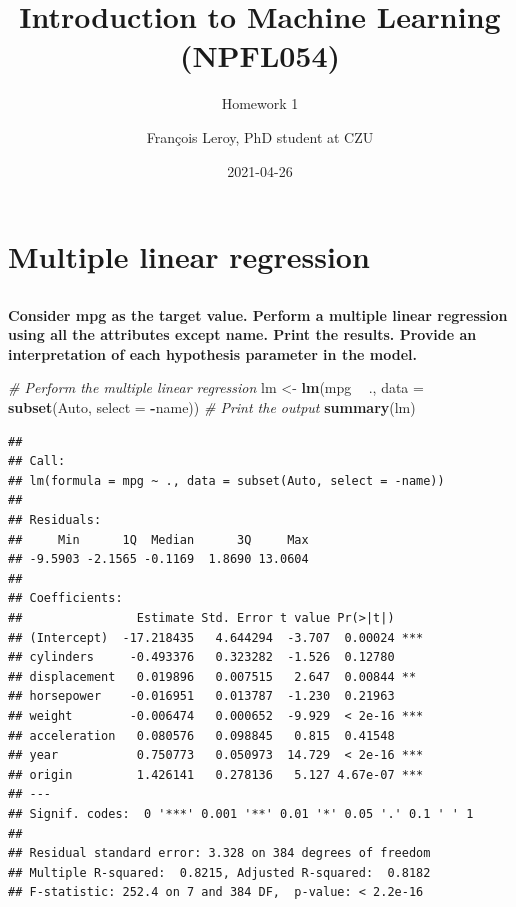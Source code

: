 \documentclass[
  12pt,
  oneside]{report}
\title{Introduction to Machine Learning\\
(NPFL054)}
\subtitle{Homework 1}
\author{François Leroy, PhD student at CZU}
\date{2021-04-26}
\newenvironment{Shaded}{\begin{snugshade}}{\end{snugshade}}
\newcommand{\CommentTok}[1]{\textcolor[rgb]{0.56,0.35,0.01}{\textit{#1}}}
\newcommand{\DataTypeTok}[1]{\textcolor[rgb]{0.13,0.29,0.53}{#1}}
\newcommand{\KeywordTok}[1]{\textcolor[rgb]{0.13,0.29,0.53}{\textbf{#1}}}
\newcommand{\NormalTok}[1]{#1}
\newcommand{\OperatorTok}[1]{\textcolor[rgb]{0.81,0.36,0.00}{\textbf{#1}}}
\newcommand{\StringTok}[1]{\textcolor[rgb]{0.31,0.60,0.02}{#1}}
\begin{document}
\maketitle


\cleardoublepage 
{}

{
\hypersetup{linkcolor=}
\setcounter{tocdepth}{1}
\tableofcontents
\newpage
}
\vspace{50mm}


\cleardoublepage 
{}


\hypertarget{q1}{%
\chapter{Multiple linear regression}\label{q1}}

\hypertarget{section}{%
\section{}\label{section}}

\textbf{Consider mpg as the target value. Perform a multiple linear regression using all the attributes
except name. Print the results. Provide an interpretation of each hypothesis parameter in
the model.}

\begin{Shaded}
\begin{Highlighting}[]
\CommentTok{# Perform the multiple linear regression}
\NormalTok{lm <-}\StringTok{ }
\StringTok{  }\KeywordTok{lm}\NormalTok{(mpg }\OperatorTok{~}\StringTok{ }\NormalTok{., }\DataTypeTok{data =} \KeywordTok{subset}\NormalTok{(Auto, }\DataTypeTok{select =} \OperatorTok{-}\NormalTok{name))}
\CommentTok{# Print the output}
\KeywordTok{summary}\NormalTok{(lm)}
\end{Highlighting}
\end{Shaded}

\begin{verbatim}
## 
## Call:
## lm(formula = mpg ~ ., data = subset(Auto, select = -name))
## 
## Residuals:
##     Min      1Q  Median      3Q     Max 
## -9.5903 -2.1565 -0.1169  1.8690 13.0604 
## 
## Coefficients:
##                Estimate Std. Error t value Pr(>|t|)    
## (Intercept)  -17.218435   4.644294  -3.707  0.00024 ***
## cylinders     -0.493376   0.323282  -1.526  0.12780    
## displacement   0.019896   0.007515   2.647  0.00844 ** 
## horsepower    -0.016951   0.013787  -1.230  0.21963    
## weight        -0.006474   0.000652  -9.929  < 2e-16 ***
## acceleration   0.080576   0.098845   0.815  0.41548    
## year           0.750773   0.050973  14.729  < 2e-16 ***
## origin         1.426141   0.278136   5.127 4.67e-07 ***
## ---
## Signif. codes:  0 '***' 0.001 '**' 0.01 '*' 0.05 '.' 0.1 ' ' 1
## 
## Residual standard error: 3.328 on 384 degrees of freedom
## Multiple R-squared:  0.8215, Adjusted R-squared:  0.8182 
## F-statistic: 252.4 on 7 and 384 DF,  p-value: < 2.2e-16
\end{verbatim}
\end{document}
